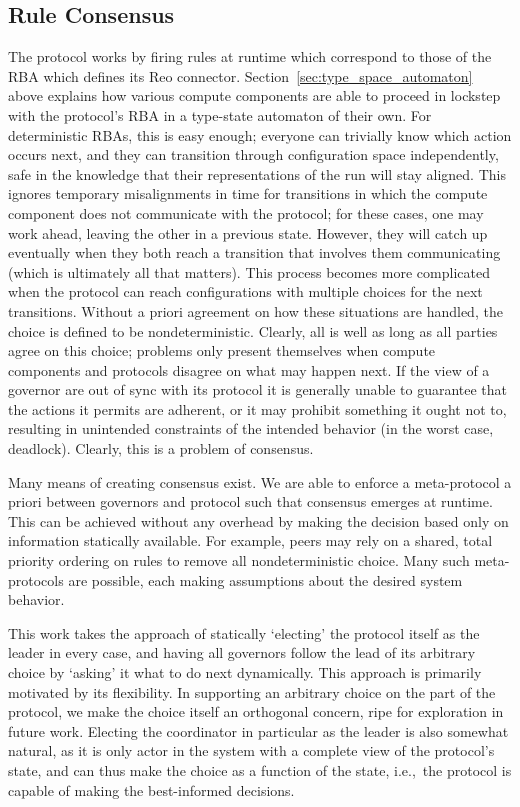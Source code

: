 \subsection{Rule Consensus}
\label{sec:rule_consensus}
The protocol works by firing rules at runtime which correspond to those of the RBA which defines its Reo connector. Section~\ref{sec:type_space_automaton} above explains how various compute components are able to proceed in lockstep with the protocol's RBA in a type-state automaton of their own. For deterministic RBAs, this is easy enough; everyone can trivially know which action occurs next, and they can transition through configuration space independently, safe in the knowledge that their representations of the run will stay aligned. This ignores temporary misalignments in time for transitions in which the compute component does not communicate with the protocol; for these cases, one may work ahead, leaving the other in a previous state. However, they will catch up eventually when they both reach a transition that involves them communicating (which is ultimately all that matters). This process becomes more complicated when the protocol can reach configurations with multiple choices for the next transitions. Without a priori agreement on how these situations are handled, the choice is defined to be nondeterministic. Clearly, all is well as long as all parties agree on this choice; problems only present themselves when compute components and protocols disagree on what may happen next. If the view of a governor are out of sync with its protocol it is generally unable to guarantee that the actions it permits are adherent, or it may prohibit something it ought not to, resulting in unintended constraints of the intended behavior (in the worst case, deadlock). Clearly, this is a problem of consensus. 


Many means of creating consensus exist. We are able to enforce a meta-protocol a priori between governors and protocol such that consensus emerges at runtime. This can be achieved without any overhead by making the decision based only on information statically available. For example, peers may rely on a shared, total priority ordering on rules to remove all nondeterministic choice. Many such meta-protocols are possible, each making assumptions about the desired system behavior.

This work takes the approach of statically `electing' the protocol itself as the leader in every case, and having all governors follow the lead of its arbitrary choice by `asking' it what to do next dynamically. This approach is primarily motivated by its flexibility. In supporting an arbitrary choice on the part of the protocol, we make the choice itself an orthogonal concern, ripe for exploration in future work. Electing the coordinator in particular as the leader is also somewhat natural, as it is only actor in the system with a complete view of the protocol's state, and can thus make the choice as a function of the state, i.e.,\ the protocol is capable of making the best-informed decisions.

